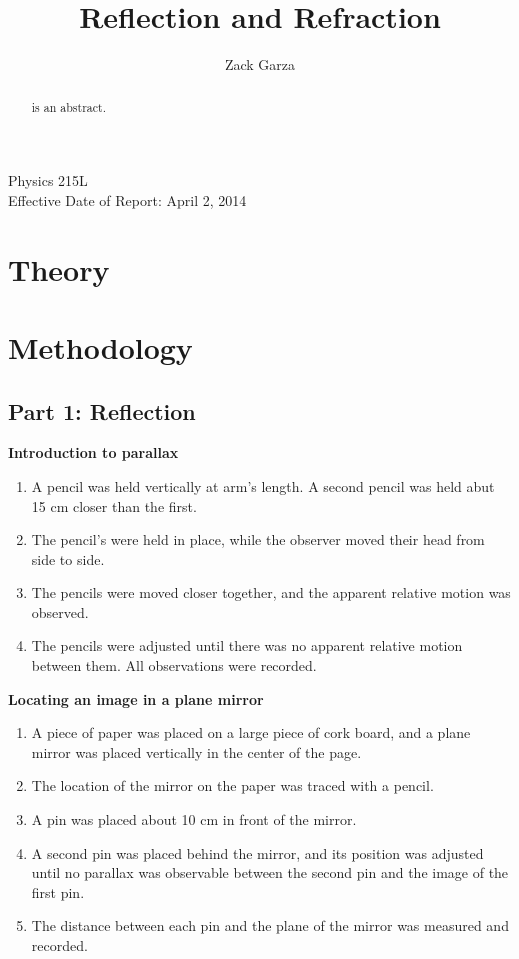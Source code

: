 \documentclass[twocolumn,english]{IEEEtran}
\theoremstyle{plain}
\theoremstyle{plain}
\begin{document}
\title{Reflection and Refraction}


\author{Zack Garza}


\IEEEspecialpapernotice
{Physics 215L \\
Effective Date of Report: April 2, 2014}


\maketitle
\begin{abstract}
 is an abstract.
\end{abstract}
\tableofcontents


\section{Theory}


\section{Methodology}

\subsection*{Part 1: Reflection}

\textbf{Introduction to parallax}
\begin{enumerate}
 \item A pencil was held vertically at arm's length. A second pencil was held abut 15 cm closer than the first.
 \item The pencil's were held in place, while the observer moved their head from side to side.
 \item The pencils were moved closer together, and the apparent relative motion was observed.
 \item The pencils were adjusted until there was no apparent relative motion between them. All observations were recorded.
\end{enumerate}

\textbf{Locating an image in a plane mirror}
\begin{enumerate}
 \item A piece of paper was placed on a large piece of cork board, and a plane mirror was placed vertically in the center of the page.
 \item The location of the mirror on the paper was traced with a pencil.
 \item A pin was placed about 10 cm in front of the mirror.
 \item A second pin was placed behind the mirror, and its position was adjusted until no parallax was observable between the second pin and the image of the first pin.
 \item The distance between each pin and the plane of the mirror was measured and recorded.
\end{enumerate}
\end{document}
